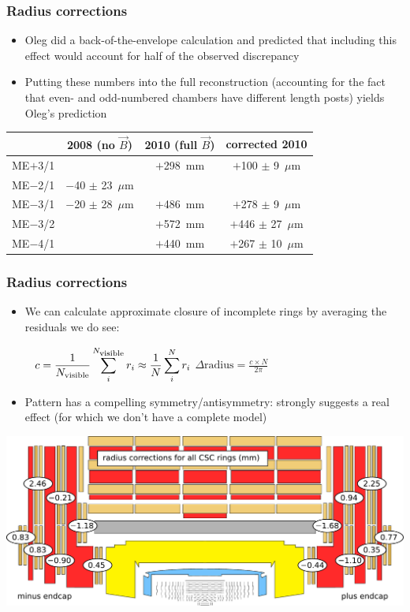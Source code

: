 \documentclass[compress]{beamer}
\begin{document}
\begin{frame}
\frametitle{Radius corrections}

\begin{itemize}
\item Oleg did a back-of-the-envelope calculation and predicted that
  including this effect would account for half of the observed discrepancy
\item Putting these numbers into the full reconstruction (accounting
  for the fact that even- and odd-numbered chambers have different
  length posts) yields Oleg's prediction
\end{itemize}

\begin{center}
\renewcommand{\arraystretch}{1.3}
\begin{tabular}{c c c c}
\hline\hline
& 2008 (no $\vec{B}$) & 2010 (full $\vec{B}$) & corrected 2010 \\\hline
ME$+$3/1 &                       & $+$298~mm & $+$100 $\pm$ 9~$\mu$m \\
ME$-$2/1 & $-$40 $\pm$ 23~$\mu$m & & \\
ME$-$3/1 & $-$20 $\pm$ 28~$\mu$m & $+$486~mm & $+$278 $\pm$ 9~$\mu$m \\
ME$-$3/2 &                       & $+$572~mm & $+$446 $\pm$ 27~$\mu$m \\
ME$-$4/1 &                       & $+$440~mm & $+$267 $\pm$ 10~$\mu$m \\\hline\hline
\end{tabular}
\end{center}
\end{frame}

\begin{frame}
\frametitle{Radius corrections}

\begin{itemize}
\item We can calculate approximate closure of incomplete rings by averaging the residuals we do see:

\mbox{ } \hfill $c = \displaystyle \frac{1}{N_{\mbox{\scriptsize visible}}}\sum_{i}^{N_{\mbox{\scriptsize visible}}} r_i \approx \frac{1}{N}\sum_{i}^{N} r_i$ \hfill $\displaystyle \Delta\mbox{radius} = \frac{c \times N}{2\pi}$ \hfill \mbox{ }

\item Pattern has a compelling symmetry/antisymmetry: strongly suggests a real effect (for which we don't have a complete model)
\end{itemize}

\includegraphics[width=\linewidth]{radial_corrections.pdf}
\end{frame}
\end{document}
